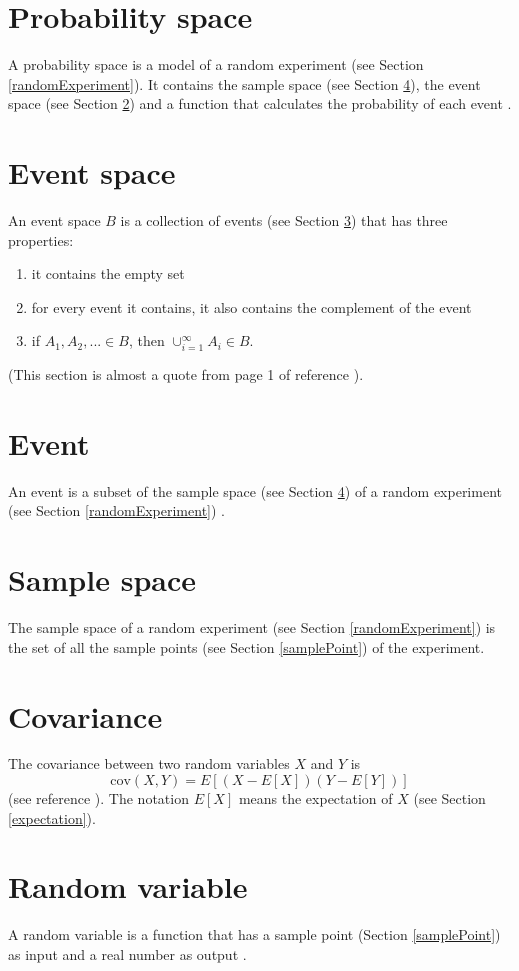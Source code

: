 \documentclass{article}
\begin{document}
\section{Probability space} \label{probabilitySpace}
A probability space is a model of a random experiment (see Section \ref{randomExperiment}).  It contains the sample space (see Section \ref{sampleSpace}), the event space (see Section \ref{eventSpace}) and a function that calculates the probability of each event \cite{wpProbabilitySpace}.
\section{Event space} \label{eventSpace}
An event space $B$ is a collection of events (see Section \ref{event}) that has three properties:
\begin{enumerate}
\item it contains the empty set
\item for every event it contains, it also contains the complement of the event
\item if $A_1, A_2, ...\in B$, then $\cup^\infty_{i=1}A_i\in B$.
\end{enumerate}
(This section is almost a quote from page 1 of reference \cite{shum}).
\section{Event} \label{event}
An event is a subset of the sample space (see Section \ref{sampleSpace}) of a random experiment (see Section \ref{randomExperiment}) \cite{shum}.
\section{Sample space} \label{sampleSpace}
The sample space of a random experiment (see Section \ref{randomExperiment}) is the set of all the sample points (see Section \ref{samplePoint}) of the experiment.
\section{Covariance} \label{covariance}
The covariance between two random variables $X$ and $Y$ is
\[\text{cov}\left(X, Y\right) = E\left[\left(X-E[X]\right)\left(Y-E[Y]\right)\right]\]
(see reference \cite{wpCovariance}).
The notation $E[X]$ means the expectation of $X$ (see Section \ref{expectation}).
\section{Random variable} \label{randomVariable}
A random variable is a function that has a sample point (Section \ref{samplePoint}) as input and a real number as output \cite{randomVariable}.
\end{document}
